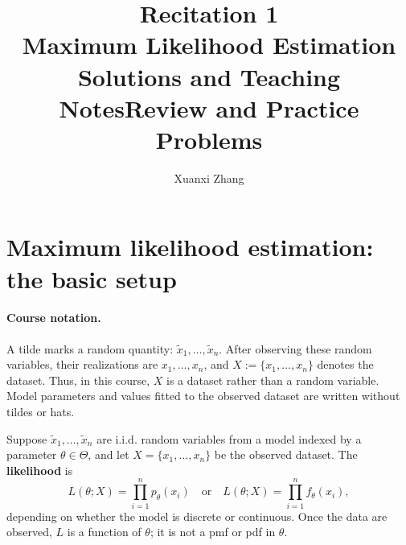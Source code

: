 \documentclass[11pt]{article}
\title{\huge Recitation 1\\[0.35em]
  \normalsize Maximum Likelihood Estimation\\[0.35em]
  \large\ifsolutions Solutions and Teaching Notes\else Review and Practice Problems\fi}
\author{Xuanxi Zhang}
\date{}
\newif\ifsolutions
\newcommand{\rv}[1]{\widetilde{#1}}
\begin{document}
\maketitle

\ifsolutions
\section*{Pacing guide (75 minutes)}
\begin{center}
\begin{tabular}{@{}lll@{}}
\toprule
Time & Activity & Suggested use \\
\midrule
0--25 min & MLE review & Setup, Poisson derivation, Gaussian derivation \\
25--37 min & Problem 1 & 7 min individual work, then discussion \\
37--50 min & Problem 2 & 7 min individual work, then discussion \\
50--66 min & Problem 3 & 8 min individual work, then discussion \\
66--75 min & Wrap-up or Problem 4 & Use Problem 4 only if the class is ahead \\
\bottomrule
\end{tabular}
\end{center}
\fi

\section{Maximum likelihood estimation: the basic setup}

\paragraph{Course notation.}
A tilde marks a random quantity: $\rv{x}_1,\ldots,\rv{x}_n$. After observing
these random variables, their realizations are $x_1,\ldots,x_n$, and
$X:=\{x_1,\ldots,x_n\}$ denotes the dataset. Thus, in this course, $X$ is a
dataset rather than a random variable. Model parameters and values fitted to
the observed dataset are written without tildes or hats.

Suppose $\rv{x}_1,\ldots,\rv{x}_n$ are i.i.d. random variables from a model
indexed by a parameter $\theta\in\Theta$, and let
$X=\{x_1,\ldots,x_n\}$ be the observed dataset. The \textbf{likelihood} is
\[
  L(\theta;X)
  = \prod_{i=1}^n p_\theta(x_i)
  \quad\text{or}\quad
  L(\theta;X)
  = \prod_{i=1}^n f_\theta(x_i),
\]
depending on whether the model is discrete or continuous. Once the data are
observed, $L$ is a function of $\theta$; it is not a pmf or pdf in $\theta$.
\end{document}
